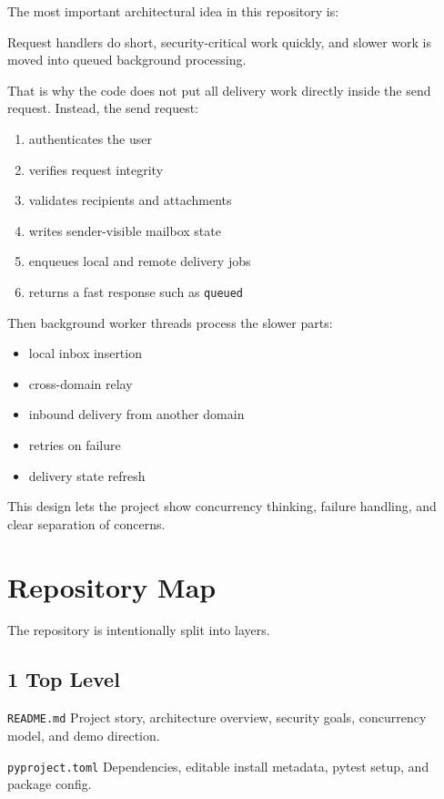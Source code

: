 \documentclass[11pt,a4paper]{article}
\begin{document}
The most important architectural idea in this repository is:

Request handlers do short, security-critical work quickly, and slower work is moved into queued background processing.

That is why the code does not put all delivery work directly inside the send request. Instead, the send request:

\begin{enumerate}
\item authenticates the user
\item verifies request integrity
\item validates recipients and attachments
\item writes sender-visible mailbox state
\item enqueues local and remote delivery jobs
\item returns a fast response such as \nolinkurl{queued}
\end{enumerate}

Then background worker threads process the slower parts:

\begin{itemize}
\item local inbox insertion
\item cross-domain relay
\item inbound delivery from another domain
\item retries on failure
\item delivery state refresh
\end{itemize}

This design lets the project show concurrency thinking, failure handling, and clear separation of concerns.


\section{Repository Map}

The repository is intentionally split into layers.

\subsection{1 Top Level}

\nolinkurl{README.md} Project story, architecture overview, security goals, concurrency model, and demo direction.

\nolinkurl{pyproject.toml} Dependencies, editable install metadata, pytest setup, and package config.
\end{document}
